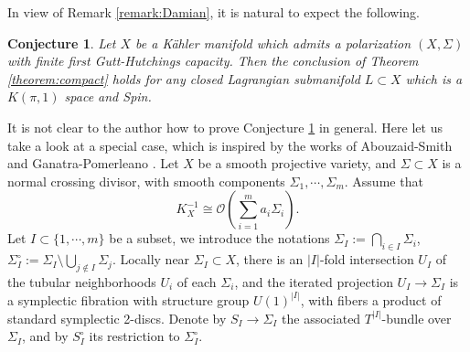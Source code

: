 \documentclass[a4paper]{article}
\newtheorem{conjecture}[theorem]{Conjecture}
\numberwithin{equation}{section}
\begin{document}
In view of Remark \ref{remark:Damian}, it is natural to expect the following.

\begin{conjecture}\label{conjecture:compact}
Let $X$ be a K\"{a}hler manifold which admits a polarization $(X,\Sigma)$ with finite first Gutt-Hutchings capacity. Then the conclusion of Theorem \ref{theorem:compact} holds for any closed Lagrangian submanifold $L\subset X$ which is a $K(\pi,1)$ space and \textit{Spin}.
\end{conjecture}

It is not clear to the author how to prove Conjecture \ref{conjecture:compact} in general. Here let us take a look at a special case, which is inspired by the works of Abouzaid-Smith \cite{asm1} and Ganatra-Pomerleano \cite{gp1}. Let $X$ be a smooth projective variety, and $\Sigma\subset X$ is a normal crossing divisor, with smooth components $\Sigma_1,\cdots,\Sigma_m$. Assume that
\begin{equation}
K_X^{-1}\cong\mathcal{O}(\sum_{i=1}^ma_i\Sigma_i).
\end{equation}
Let $I\subset\{1,\cdots,m\}$ be a subset, we introduce the notations $\Sigma_I:=\bigcap_{i\in I}\Sigma_i$, $\Sigma_I^\circ:=\Sigma_I\setminus\bigcup_{j\notin I}\Sigma_j$. Locally near $\Sigma_I\subset X$, there is an $|I|$-fold intersection $U_I$ of the tubular neighborhoods $U_i$ of each $\Sigma_i$, and the iterated projection $U_I\rightarrow\Sigma_I$ is a symplectic fibration with structure group $U(1)^{|I|}$, with fibers a product of standard symplectic 2-discs. Denote by $S_I\rightarrow\Sigma_I$ the associated $T^{|I|}$-bundle over $\Sigma_I$, and by $S_I^\circ$ its restriction to $\Sigma_I^\circ$.
\end{document}
